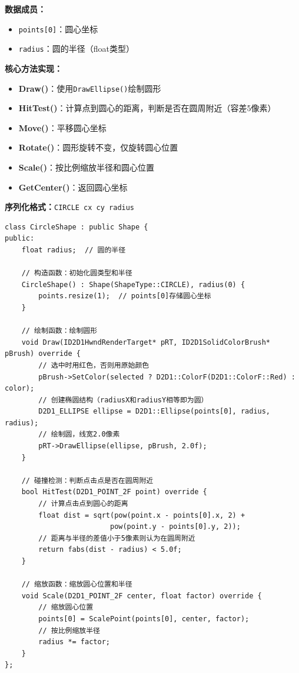 \documentclass[12pt,a4paper]{article}
\begin{document}
\begin{tcolorbox}
\textbf{数据成员：}
\begin{itemize}
    \item \texttt{points[0]}：圆心坐标
    \item \texttt{radius}：圆的半径（float类型）
\end{itemize}

\textbf{核心方法实现：}
\begin{itemize}
    \item \textbf{Draw()}：使用\texttt{DrawEllipse()}绘制圆形
    \item \textbf{HitTest()}：计算点到圆心的距离，判断是否在圆周附近（容差5像素）
    \item \textbf{Move()}：平移圆心坐标
    \item \textbf{Rotate()}：圆形旋转不变，仅旋转圆心位置
    \item \textbf{Scale()}：按比例缩放半径和圆心位置
    \item \textbf{GetCenter()}：返回圆心坐标
\end{itemize}

\textbf{序列化格式：}\texttt{CIRCLE cx cy radius}
\end{tcolorbox}

\begin{lstlisting}[caption=CircleShape类定义]
class CircleShape : public Shape {
public:
    float radius;  // 圆的半径
    
    // 构造函数：初始化圆类型和半径
    CircleShape() : Shape(ShapeType::CIRCLE), radius(0) {
        points.resize(1);  // points[0]存储圆心坐标
    }
    
    // 绘制函数：绘制圆形
    void Draw(ID2D1HwndRenderTarget* pRT, ID2D1SolidColorBrush* pBrush) override {
        // 选中时用红色，否则用原始颜色
        pBrush->SetColor(selected ? D2D1::ColorF(D2D1::ColorF::Red) : color);
        // 创建椭圆结构（radiusX和radiusY相等即为圆）
        D2D1_ELLIPSE ellipse = D2D1::Ellipse(points[0], radius, radius);
        // 绘制圆，线宽2.0像素
        pRT->DrawEllipse(ellipse, pBrush, 2.0f);
    }
    
    // 碰撞检测：判断点击点是否在圆周附近
    bool HitTest(D2D1_POINT_2F point) override {
        // 计算点击点到圆心的距离
        float dist = sqrt(pow(point.x - points[0].x, 2) + 
                         pow(point.y - points[0].y, 2));
        // 距离与半径的差值小于5像素则认为在圆周附近
        return fabs(dist - radius) < 5.0f;
    }
    
    // 缩放函数：缩放圆心位置和半径
    void Scale(D2D1_POINT_2F center, float factor) override {
        // 缩放圆心位置
        points[0] = ScalePoint(points[0], center, factor);
        // 按比例缩放半径
        radius *= factor;
    }
};
\end{lstlisting}
\end{document}

